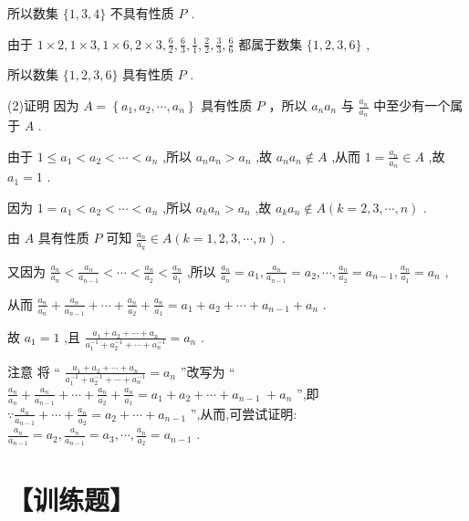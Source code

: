 \documentclass[10pt]{article}
\begin{document}
所以数集 \(\{ 1,3,4\}\) 不具有性质 \(P\) .

由于 \(1 \times  2,1 \times  3,1 \times  6,2 \times  3,\frac{6}{2},\frac{6}{3},\frac{1}{1},\frac{2}{2},\frac{3}{3},\frac{6}{6}\) 都属于数集 \(\{ 1,2,3,6\}\) ,

所以数集 \(\{ 1,2,3,6\}\) 具有性质 \(P\) .

(2)证明 因为 \(A = \left\{  {{a}_{1},{a}_{2},\cdots ,{a}_{n}}\right\}\) 具有性质 \(P\) ，所以 \({a}_{n}{a}_{n}\) 与 \(\frac{{a}_{n}}{{a}_{n}}\) 中至少有一个属于 \(A\) .

由于 \(1 \leq  {a}_{1} < {a}_{2} < \cdots  < {a}_{n}\) ,所以 \({a}_{n}{a}_{n} > {a}_{n}\) ,故 \({a}_{n}{a}_{n} \notin  A\) ,从而 \(1 = \frac{{a}_{n}}{{a}_{n}} \in  A\) ,故 \({a}_{1} = 1\) .

因为 \(1 = {a}_{1} < {a}_{2} < \cdots  < {a}_{n}\) ,所以 \({a}_{k}{a}_{n} > {a}_{n}\) ,故 \({a}_{k}{a}_{n} \notin  A\left( {k = 2,3,\cdots ,n}\right)\) .

由 \(A\) 具有性质 \(P\) 可知 \(\frac{{a}_{n}}{{a}_{k}} \in  A\left( {k = 1,2,3,\cdots ,n}\right)\) .

又因为 \(\frac{{a}_{n}}{{a}_{n}} < \frac{{a}_{n}}{{a}_{n - 1}} < \cdots  < \frac{{a}_{n}}{{a}_{2}} < \frac{{a}_{n}}{{a}_{1}}\) ,所以 \(\frac{{a}_{n}}{{a}_{n}} = {a}_{1},\frac{{a}_{n}}{{a}_{n - 1}} = {a}_{2},\cdots ,\frac{{a}_{n}}{{a}_{2}} = {a}_{n - 1},\frac{{a}_{n}}{{a}_{1}} = {a}_{n}\) ,

从而 \(\frac{{a}_{n}}{{a}_{n}} + \frac{{a}_{n}}{{a}_{n - 1}} + \cdots  + \frac{{a}_{n}}{{a}_{2}} + \frac{{a}_{n}}{{a}_{1}} = {a}_{1} + {a}_{2} + \cdots  + {a}_{n - 1} + {a}_{n}\) .

故 \({a}_{1} = 1\) ,且 \(\frac{{a}_{1} + {a}_{2} + \cdots  + {a}_{n}}{{a}_{1}^{-1} + {a}_{2}^{-1} + \cdots  + {a}_{n}^{-1}} = {a}_{n}\) .

注意 将 “ \(\frac{{a}_{1} + {a}_{2} + \cdots  + {a}_{n}}{{a}_{1}^{-1} + {a}_{2}^{-1} + \cdots  + {a}_{n}^{-1}} = {a}_{n}\) ”改写为 “ \(\frac{{a}_{n}}{{a}_{n}} + \frac{{a}_{n}}{{a}_{n - 1}} + \cdots  + \frac{{a}_{n}}{{a}_{2}} + \frac{{a}_{n}}{{a}_{1}} = {a}_{1} + {a}_{2} + \cdots  + {a}_{n - 1} \; + {a}_{n}\) ”,即 \(\because \frac{{a}_{n}}{{a}_{n - 1}} + \cdots  + \frac{{a}_{n}}{{a}_{2}} = {a}_{2} + \cdots  + {a}_{n - 1}\) ”,从而,可尝试证明: \(\frac{{a}_{n}}{{a}_{n - 1}} = {a}_{2},\frac{{a}_{n}}{{a}_{n - 1}} = {a}_{3},\cdots ,\frac{{a}_{n}}{{a}_{2}} = {a}_{n - 1}\) .

\section*{【训练题】}
\end{document}
